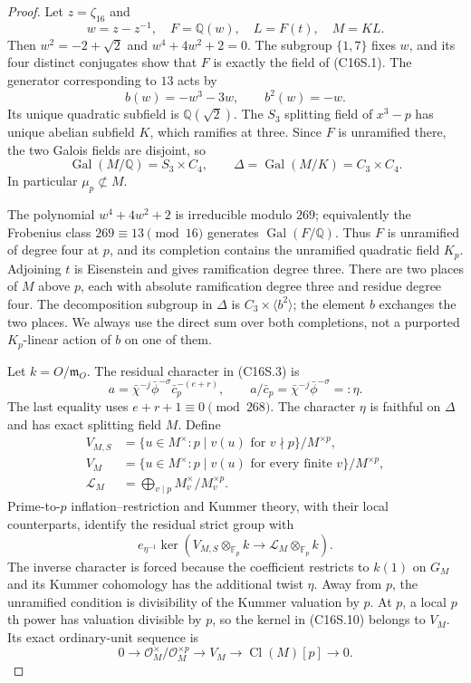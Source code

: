 \begin{proof}
Let $z=\zeta_{16}$ and
\[
 w=z-z^{-1},\quad F=\mathbb Q(w),\quad L=F(t),\quad M=KL.
 \tag{C16S.5}
\]
Then $w^2=-2+\sqrt2$ and $w^4+4w^2+2=0$.
The subgroup $\{1,7\}$ fixes $w$, and its four distinct
conjugates show that $F$ is exactly the field of (C16S.1).
The generator corresponding to $13$ acts by
\[
              b(w)=-w^3-3w,\qquad b^2(w)=-w.
 \tag{C16S.6}
\]
Its unique quadratic subfield is $\mathbb Q(\sqrt2)$.
The $S_3$ splitting field of $x^3-p$ has unique abelian
subfield $K$, which ramifies at three.  Since $F$ is
unramified there, the two Galois fields are disjoint, so
\[
 \operatorname{Gal}(M/\mathbb Q)=S_3\times C_4,
 \qquad\Delta=\operatorname{Gal}(M/K)=C_3\times C_4.
 \tag{C16S.7}
\]
In particular $\mu_p\not\subset M$.

The polynomial $w^4+4w^2+2$ is irreducible modulo $269$;
equivalently the Frobenius class $269\equiv13\pmod{16}$
generates $\operatorname{Gal}(F/\mathbb Q)$.
Thus $F$ is unramified of degree four at $p$, and its
completion contains the unramified quadratic field $K_p$.
Adjoining $t$ is Eisenstein and gives ramification degree
three.  There are two places of $M$ above $p$, each with
absolute ramification degree three and residue degree four.
The decomposition subgroup in $\Delta$ is
$C_3\times\langle b^2\rangle$; the element $b$ exchanges
the two places.  We always use the direct sum over both
completions, not a purported $K_p$-linear action of $b$
on one of them.

Let $k=O/\mathfrak m_O$.  The residual character in (C16S.3)
is
\[
 a=\bar\chi^{-j}\bar\phi^{-\sigma}\bar c_p^{-(e+r)},
 \qquad a/\bar c_p=\bar\chi^{-j}\bar\phi^{-\sigma}
                         =:\eta.
 \tag{C16S.8}
\]
The last equality uses $e+r+1\equiv0\pmod{268}$.
The character $\eta$ is faithful on $\Delta$ and has exact
splitting field $M$.  Define
\[
 \begin{split}
 V_{M,S}&=\{u\in M^\times:p\mid v(u)\text{ for }v\nmid p\}/M^{\times p},\\
 V_M&=\{u\in M^\times:p\mid v(u)\text{ for every finite }v\}/M^{\times p},\\
 \mathcal L_M&=\bigoplus_{v\mid p}M_v^\times/M_v^{\times p}.
 \end{split}\tag{C16S.9}
\]
Prime-to-$p$ inflation--restriction and Kummer theory,
with their local counterparts, identify the residual strict
group with
\[
 e_{\eta^{-1}}\ker\left(V_{M,S}\otimes_{\mathbb F_p}k
                  \longrightarrow\mathcal L_M\otimes_{\mathbb F_p}k\right).
 \tag{C16S.10}
\]
The inverse character is forced because the coefficient
restricts to $k(1)$ on $G_M$ and its Kummer cohomology has
the additional twist $\eta$.  Away from $p$, the unramified
condition is divisibility of the Kummer valuation by $p$.
At $p$, a local $p$th power has valuation divisible by $p$,
so the kernel in (C16S.10) belongs to $V_M$.
Its exact ordinary-unit sequence is
\[
 0\longrightarrow\mathcal O_M^\times/\mathcal O_M^{\times p}
 \longrightarrow V_M\longrightarrow\operatorname{Cl}(M)[p]
 \longrightarrow0.
 \tag{C16S.11}
\]


\end{proof}
